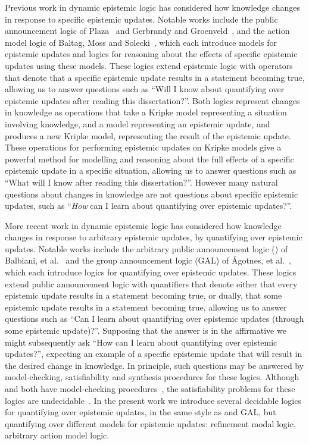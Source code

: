Previous work in dynamic epistemic logic has considered how knowledge changes in response to specific epistemic updates.
Notable works include the public announcement logic of Plaza~\cite{plaza:1989} and Gerbrandy and Groenveld~\cite{gerbrandy:1997}, and the action model logic of Baltag, Moss and Solecki~\cite{baltag:1998,baltag:2004}, which each introduce models for epistemic updates and logics for reasoning about the effects of specific epistemic updates using these models.
These logics extend epistemic logic with operators that denote that a specific epistemic update results in a statement becoming true, allowing us to answer questions such as ``Will I know about quantifying over epistemic updates after reading this dissertation?''.
Both logics represent changes in knowledge as operations that take a Kripke model representing a situation involving knowledge, and a model representing an epistemic update, and produces a new Kripke model, representing the result of the epistemic update.
These operations for performing epistemic updates on Kripke models give a powerful method for modelling and reasoning about the full effects of a specific epistemic update in a specific situation, allowing us to answer questions such as ``What will I know after reading this dissertation?''.
However many natural questions about changes in knowledge are not questions about specific epistemic updates, such as ``{\em How} can I learn about quantifying over epistemic updates?''.

More recent work in dynamic epistemic logic has considered how knowledge changes in response to arbitrary epistemic updates, by quantifying over epistemic updates.
Notable works include the arbitrary public announcement logic (\logicApal{}) of Balbiani, et al.~\cite{balbiani:2007} and the group announcement logic (GAL) of {\AA}gotnes, et al.~\cite{agotnes:2008,agotnes:2010}, which each introduce logics for quantifying over epistemic updates.
These logics extend public announcement logic with quantifiers that denote either that every epistemic update results in a statement becoming true, or dually, that some epistemic update results in a statement becoming true, allowing us to answer questions such as ``Can I learn about quantifying over epistemic updates (through some epistemic update)?''.
Supposing that the answer is in the affirmative we might subsequently ask ``How can I learn about quantifying over epistemic updates?'', expecting an example of a specific epistemic update that will result in the desired change in knowledge.
In principle, such questions may be answered by model-checking, satisfiability and synthesis procedures for these logics.
Although \logicApal{} and \logicGal{} both have model-checking procedures~\cite{agotnes:2010}, the satisfiability problems for these logics are undecidable~\cite{agotnes:2014}.
In the present work we introduce several decidable logics for quantifying over epistemic updates, in the same style as \logicApal{} and GAL, but quantifying over different models for epistemic updates: refinement modal logic, arbitrary action model logic.

